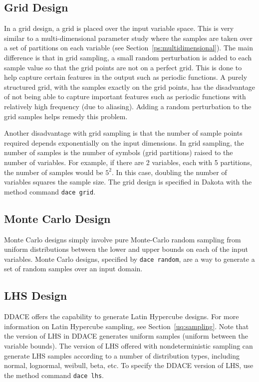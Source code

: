 \subsection{Grid Design}\label{dace:grid}

In a grid design, a grid is placed over the input variable space. 
This is very similar to a multi-dimensional parameter study where 
the samples are taken over a set of partitions on each variable 
(see Section~\ref{ps:multidimensional}). The main difference is 
that in grid sampling, a small random perturbation is added 
to each sample value so that the grid points are not on a perfect grid. 
This is done to help capture certain features in the output such as periodic
functions. A purely structured grid, with the samples exactly on the grid 
points, has the disadvantage of not being able to capture important features 
such as periodic functions with relatively high frequency (due to aliasing). 
Adding a random perturbation to the grid samples helps remedy this problem.

Another disadvantage with grid sampling is that the number of sample points 
required depends exponentially on the input dimensions. In grid sampling, 
the number of samples is the number of symbols (grid partitions) raised 
to the number of variables. For example, if there are 2 variables, each 
with 5 partitions, the number of samples would be $5^2$. In this 
case, doubling the number of variables squares the sample size. 
The grid design is specified in 
Dakota with the method command \texttt{dace grid}.

\subsection{Monte Carlo Design}\label{dace:mc}

Monte Carlo designs simply involve pure Monte-Carlo random sampling 
from uniform distributions between the lower and upper bounds on each 
of the input variables. Monte Carlo designs, specified by 
\texttt{dace random}, are a way to generate a set of random samples 
over an input domain.

\subsection{LHS Design}\label{dace:lhs}

DDACE offers the capability to generate Latin Hypercube designs. 
For more information on Latin Hypercube sampling, see 
Section~\ref{uq:sampling}. Note that the version of LHS in DDACE 
generates uniform samples (uniform between the variable bounds). 
The version of LHS offered with nondeterministic sampling can generate 
LHS samples according to a number of distribution types, including 
normal, lognormal, weibull, beta, etc. To specify the DDACE version 
of LHS, use the method command \texttt{dace lhs}.

